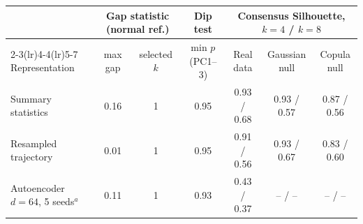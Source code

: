 \begin{tabular}{lcccccc}\toprule
 & \multicolumn{2}{c}{Gap statistic (normal ref.)} & Dip test & \multicolumn{3}{c}{Consensus Silhouette, $k=4$ / $k=8$} \\ \cmidrule(lr){2-3}\cmidrule(lr){4-4}\cmidrule(lr){5-7}
Representation & max gap & selected $k$ & min $p$ (PC1--3) & Real data & Gaussian null & Copula null \\ \midrule
Summary statistics & 0.16 & 1 & 0.95 & 0.93 / 0.68 & 0.93 / 0.57 & 0.87 / 0.56 \\
Resampled trajectory & 0.01 & 1 & 0.95 & 0.91 / 0.56 & 0.93 / 0.67 & 0.83 / 0.60 \\
Autoencoder $d=64$, 5 seeds$^a$ & 0.11 & 1 & 0.93 & 0.43 / 0.37 & -- / -- & -- / -- \\
\bottomrule\end{tabular}